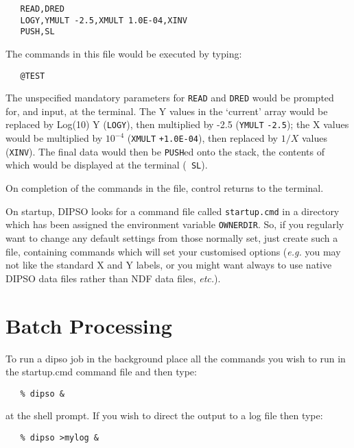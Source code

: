 \documentclass[twoside,11pt]{article}
\newcommand{\htmlref}[2]{#1}
\renewcommand{\_}{\texttt{\symbol{95}}}
\begin{document}
\begin{verbatim}
   READ,DRED
   LOGY,YMULT -2.5,XMULT 1.0E-04,XINV
   PUSH,SL
\end{verbatim}

The commands in this file would be executed by typing:

\begin{verbatim}
   @TEST
\end{verbatim}

The unspecified mandatory parameters for \htmlref{{\tt{READ}}}{COM:READ} 
and \htmlref{{\tt{DRED}}}{COM:DRED}  would be prompted for, and input, at
the terminal. The Y values in the `current' array would be replaced by
Log(10) Y (\htmlref{{\tt{LOGY}}}{COM:LOGY}),  then multiplied by -2.5
(\htmlref{{\tt{YMULT}}}{COM:YMULT}  {\tt{-2.5}});  the X values would be multiplied
by $10^{-4}$ (\htmlref{{\tt{XMULT}}}{COM:XMULT}  {\tt{+1.0E-04}}),  then replaced
by $1/X$ values (\htmlref{{\tt{XINV}}}{COM:XINV}).  The final data
would then be \htmlref{{\tt{PUSH}}}{COM:PUSH}ed  onto the stack, the
contents of which would be displayed at the terminal (\htmlref{{\tt
SL}}{COM:SL}).

On completion of the commands in the file, control returns to the terminal.

On startup, DIPSO looks for a command file called {\tt{startup.cmd}} 
in a directory which has been
assigned the environment variable {\tt{OWNERDIR}}.  So, if
you regularly want to change any default settings from those normally
set, just create such a file, containing commands which will set your
customised options ({\em e.g.} you may not like the standard X and Y
labels, or you might want always to use native DIPSO data files rather
than NDF data files, {\em etc.}).

\section {Batch Processing}

To run a dipso job in the background place all the commands you wish
to run in the startup.cmd command file and then type:

\begin{verbatim}
   % dipso &
\end{verbatim}

at the shell prompt. If you wish to direct the output to a log file
then type:

\begin{verbatim}
   % dipso >mylog &
\end{verbatim}
\end{document}
